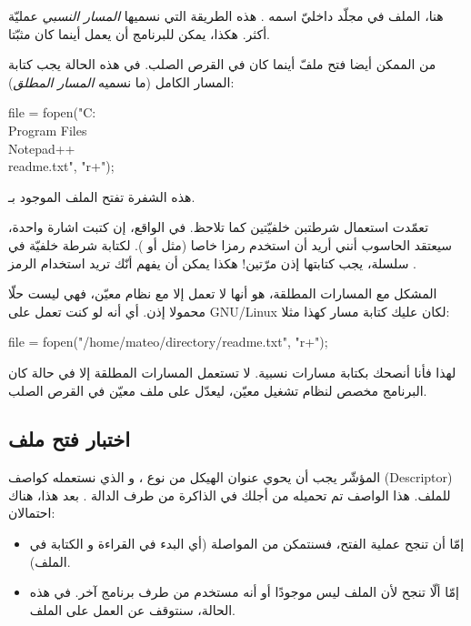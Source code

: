 هنا، الملف
في مجلّد  داخليّ اسمه
.
هذه الطريقة التي نسميها
\textit{المسار النسبي}
عمليّة أكثر. هكذا، يمكن للبرنامج أن يعمل أينما كان مثبّتا.

من الممكن أيضا فتح ملفّ أينما كان في القرص الصلب. في هذه الحالة يجب كتابة المسار الكامل (ما نسميه
\textit{المسار المطلق}):

\begin{Csource}
  file = fopen("C:\\Program Files\\Notepad++\\readme.txt", "r+");
\end{Csource}

هذه الشفرة تفتح الملف
الموجود بـ.

\begin{warning}
  تعمّدت استعمال شرطتبن خلفيّتين
\InlineCode{\textbackslash}
  كما تلاحظ. في الواقع، إن كتبت اشارة واحدة، سيعتقد الحاسوب أنني أريد أن استخدم رمزا خاصا (مثل 
أو ).
لكتابة شرطة خلفيّة في سلسلة، يجب كتابتها إذن مرّتين! هكذا يمكن أن يفهم أنّك تريد استخدام الرمز
\InlineCode{\textbackslash}.
\end{warning}

المشكل مع المسارات المطلقة، هو أنها لا تعمل إلا مع نظام معيّن، فهي ليست حلّا محمولا إذن. أي أنه لو كنت تعمل على
\textenglish{GNU/Linux}
لكان عليك كتابة مسار كهذا مثلا:

\begin{Csource}
  file = fopen("/home/mateo/directory/readme.txt", "r+");
\end{Csource}

لهذا فأنا أنصحك بكتابة مسارات نسبية. لا تستعمل المسارات المطلقة إلا في حالة كان البرنامج مخصص لنظام تشغيل معيّن، ليعدّل على ملف معيّن في القرص الصلب.

\subsection{اختبار فتح ملف}
المؤشّر
يجب أن يحوي عنوان الهيكل من نوع
،
و الذي نستعمله كواصف
(\textenglish{Descriptor})
للملف. هذا الواصف تم تحميله من أجلك في الذاكرة من طرف الدالة
.
بعد هذا، هناك احتمالان:

\begin{itemize}
  \item إمّا أن تنجح عملية الفتح، فسنتمكن من المواصلة (أي البدء في القراءة و الكتابة في الملف).
  \item إمّا ألّا تنجح لأن الملف ليس موجودًا أو أنه مستخدم من طرف برنامج آخر. في هذه الحالة، سنتوقف عن العمل على الملف.
\end{itemize}

